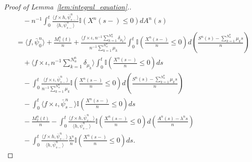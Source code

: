 \documentclass[a4paper,11pt,twoside]{article}
\numberwithin{equation}{section}
\numberwithin{figure}{section}
\theoremstyle{plain}
\newcommand{\II}{\mathbb{I}}
\newcommand{\1}{\mathbbm{1}}
\begin{document}
\begin{proof}[Proof of Lemma~\ref{lem:integral_equation}.]
\begin{align}
  \nonumber&\quad- n^{-1}\int_0^t \frac{\langle f\times h, \bar{\psi}_{s-}^n\rangle}{\langle h, \bar\psi_{s-}^n\rangle}\II(X^n(s-)\leq 0)dA^n(s)\\
      \nonumber &=\langle f, \bar{\psi}_0^{n}\rangle + \frac{M_1^n(t)}{n} + \frac{\langle f\times \iota, n^{-1}\sum_{k=1}^{N^n_\alpha}\delta_{\mu_k}\rangle}{n^{-1}\sum_{k=1}^{N^n_\alpha}\mu_k}\int_0^t\II\left(\frac{X^n(s-)}{n}\leq 0\right)d\left(\frac{S^n(s)-\sum_{k=1}^{N^n_\alpha}\mu_ks}{n}\right)\\
      \nonumber &\quad+\langle f\times \iota, n^{-1}\sum_{k=1}^{N^n_\alpha}\delta_{\mu_k} \rangle \int_0^t\II\left(\frac{X^n(s-)}{n}\leq 0\right)ds 
      \\
      \nonumber&\quad-\int_0^t\frac{\langle f\times \iota, \bar{\psi}_{s-}^n \rangle}{n^{-1}\sum_{k=1}^{N^n_\alpha}\mu_k}\II\left(\frac{X^n(s-)}{n}\leq 0\right)d\left(\frac{S^n(s)-\sum_{k=1}^{N^n_\alpha}\mu_ks}{n}\right)
      \\
      \nonumber&\quad 
      -\int_0^t\langle f\times \iota, \bar{\psi}_{s-}^n \rangle \II\left(\frac{X^n(s-)}{n}\leq 0\right)ds
      \\
      \nonumber&\quad  
      - \frac{M_2^n(t)}{n} - \int_0^t \frac{\langle f\times h, 
      \bar{\psi}_{s-}^n\rangle}{\langle h, \bar{\psi}_{s-}^{n}\rangle}\II\left(\frac{X^n(s-)}{n}\leq 0\right)d\left(\frac{A^n(s)-\lambda^ns}{n}\right)\\
      &\quad-\int_0^t \frac{\langle f\times h, \bar{\psi}_{s-}^n\rangle}{\langle h, \bar{\psi}_{s-}^n\rangle}\frac{\lambda^n}{n}\II\left(\frac{X^n(s-)}{n}\leq 0\right)ds.
      \label{eq:idle_balance_decomp}
\end{align} 


\end{proof}
\end{document}
